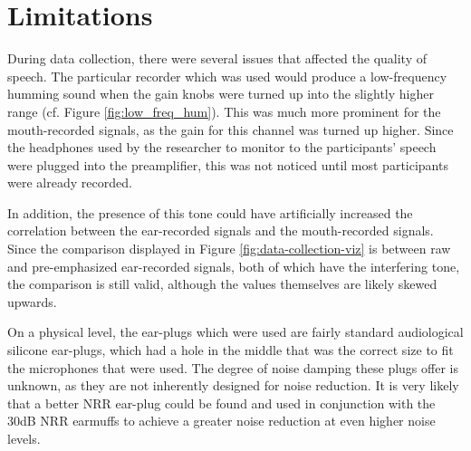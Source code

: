 
\section{Limitations}
\label{chap2:limitations}

During data collection, there were several issues that affected the quality of speech.  
The particular recorder which was used would produce a low-frequency humming sound when the gain knobs were turned up into the slightly higher range (cf. Figure \ref{fig:low_freq_hum}).  This was much more prominent for the mouth-recorded signals, as the gain for this channel was turned up higher.  Since the headphones used by the researcher to monitor to the participants' speech were plugged into the preamplifier, this was not noticed until most participants were already recorded.

In addition, the presence of this tone could have artificially increased the correlation between the ear-recorded signals and the mouth-recorded signals.  Since the comparison displayed in Figure \ref{fig:data-collection-viz} is between raw and pre-emphasized ear-recorded signals, both of which have the interfering tone, the comparison is still valid, although the values themselves are likely skewed upwards.

On a physical level, the ear-plugs which were used are fairly standard audiological silicone ear-plugs, which had a hole in the middle that was the correct size to fit the microphones that were used.  The degree of noise damping these plugs offer is unknown, as they are not inherently designed for noise reduction.  It is very likely that a better NRR ear-plug could be found and used in conjunction with the 30dB NRR earmuffs to achieve a greater noise reduction at even higher noise levels.

